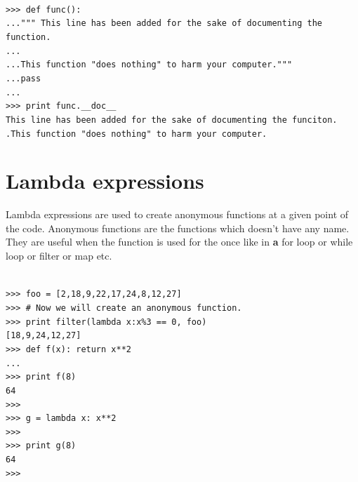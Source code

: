 \documentclass[12pt,a4paper]{article}
\begin{document}
\texttt{\\
>>> def func():\\
...\hspace{30pt}""" This line has been added for the sake of documenting the function.\\
...\hspace{30pt}\\
...\hspace{30pt}This function "does nothing" to harm your computer."""\\
...\hspace{30pt}pass\\
...\\
>>> print func.\_\_doc\_\_\\
This line has been added for the sake of documenting the funciton.\\
\linebreak
.\hspace{30pt}This function "does nothing" to harm your computer.
}


\section{Lambda expressions}
Lambda expressions are used to create anonymous functions  at  a given point of the code. Anonymous functions are the functions which doesn't have any name.  They are useful when the function is used for the once like in \textbf{a} for loop or while loop or filter or map etc.

\texttt{\\
>>> foo = [2,18,9,22,17,24,8,12,27]\\
>>> \# Now we will create an anonymous function.\\
>>> print filter(lambda x:x\%3 == 0, foo)\\
{[18,9,24,12,27]}\\
>>> def f(x): return x**2\\
...\\
>>> print f(8)\\
64\\
>>>\\
>>> g = lambda x: x**2\\
>>>\\
>>> print g(8)\\
64\\
>>>
}
\end{document}
